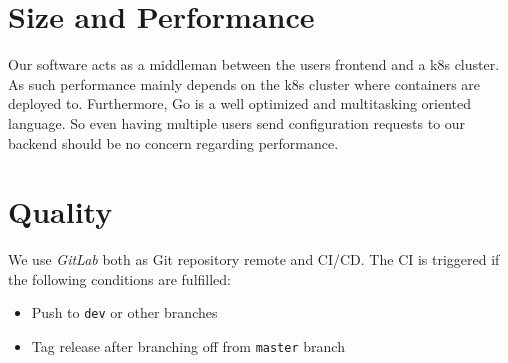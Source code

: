 \documentclass[a4paper,12pt,chapterprefix=false,bibliography=totoc,listof=totoc,]{scrreprt}
\begin{document}


\chapter{Size and Performance}
Our software acts as a middleman between the users frontend and a \gls{k8s} cluster. As such performance mainly depends on the \gls{k8s} cluster where containers are deployed to. Furthermore, Go is a well optimized and multitasking oriented language. So even having multiple users send configuration requests to our backend should be no concern regarding performance.

\chapter{Quality}
We use \textit{GitLab} both as Git repository remote and CI/CD. The CI is triggered if the following conditions are fulfilled:
\begin{itemize}
	\item Push to \texttt{dev} or other branches
	\item Tag release after branching off from \texttt{master} branch
\end{itemize}
\end{document}
